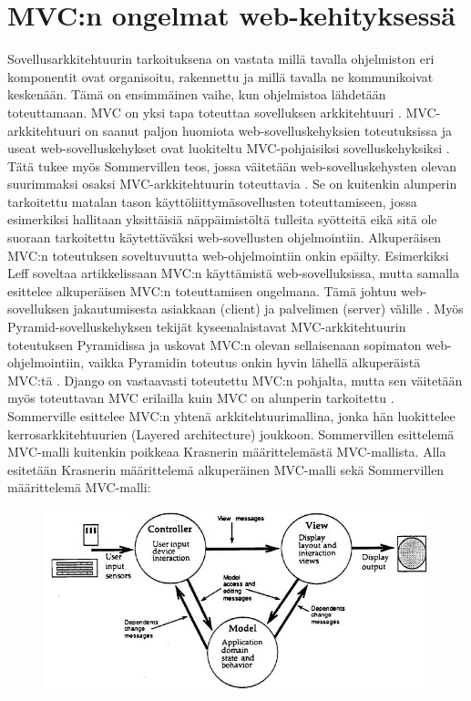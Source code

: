\documentclass[utf8]{gradu3}
\begin{document}
\section{MVC:n ongelmat web-kehityksessä}
Sovellusarkkitehtuurin tarkoituksena on vastata millä tavalla ohjelmiston eri komponentit ovat organisoitu, rakennettu ja millä tavalla ne kommunikoivat keskenään. Tämä on ensimmäinen vaihe, kun ohjelmistoa lähdetään toteuttamaan. MVC on yksi tapa
toteuttaa sovelluksen arkkitehtuuri    \parencite[s. 148]{Sommerville}. MVC-arkkitehtuuri on saanut paljon huomiota web-sovelluskehyksien
toteutuksissa ja useat web-sovelluskehykset ovat luokiteltu
MVC-pohjaisiksi sovelluskehyksiksi \parencite{mvcframeworks}. Tätä tukee myös Sommervillen teos, jossa väitetään web-sovelluskehysten olevan suurimmaksi osaksi MVC-arkkitehtuurin toteuttavia \parencite[s. 432]{Sommerville}.
Se on kuitenkin alunperin tarkoitettu matalan tason käyttöliittymäsovellusten toteuttamiseen,
jossa esimerkiksi hallitaan yksittäisiä näppäimistöltä tulleita
syötteitä eikä sitä ole suoraan tarkoitettu käytettäväksi
web-sovellusten ohjelmointiin. Alkuperäisen MVC:n toteutuksen
soveltuvuutta web-ohjelmointiin onkin epäilty. Esimerkiksi Leff
soveltaa artikkelissaan MVC:n käyttämistä web-sovelluksissa, mutta
samalla esittelee alkuperäisen MVC:n toteuttamisen ongelmana. Tämä johtuu web-sovelluksen jakautumisesta asiakkaan
(client) ja palvelimen (server) välille \parencite{ibm_watson}. Myös Pyramid-sovelluskehyksen tekijät
kyseenalaistavat MVC-arkkitehtuurin toteutuksen Pyramidissa ja uskovat
MVC:n olevan sellaisenaan sopimaton web-ohjelmointiin, vaikka
Pyramidin toteutus onkin hyvin lähellä alkuperäistä MVC:tä
\parencite{pyramid}. Django on vastaavasti toteutettu MVC:n pohjalta, mutta sen väitetään
myös toteuttavan MVC erilailla kuin MVC on alunperin tarkoitettu \parencite{django_mvc}.
Sommerville \parencite[s. 157]{Sommerville} esittelee MVC:n yhtenä arkkitehtuurimallina, jonka hän luokittelee
 kerrosarkkitehtuurien (Layered architecture) joukkoon. Sommervillen esittelemä  MVC-malli kuitenkin poikkeaa Krasnerin \parencite{krasner} määrittelemästä MVC-mallista. Alla esitetään Krasnerin määrittelemä alkuperäinen MVC-malli sekä Sommervillen määrittelemä MVC-malli:


\begin{figure}[h]
\centering
\includegraphics[scale=0.5]{krasner_mvc.jpg}
\caption{\parencite[s. 5]{krasner_desc}}
\end{figure}
\end{document}
